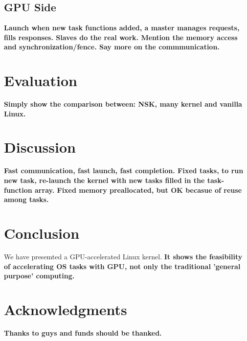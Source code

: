 \documentclass[letterpaper,twocolumn,10pt]{article}
\begin{document}
\subsection{GPU Side}

{\color{red} \bf  Launch when new task functions added, a master manages requests, fills responses. Slaves do the real work. Mention the memory access and synchronization/fence. Say more on the commmunication.}


\section{Evaluation}

{\color{red} \bf Simply show the comparison between: NSK, many kernel and vanilla Linux.}


\section{Discussion}

{\color{red} \bf Fast communication, fast launch, fast completion. Fixed tasks, to run new task, re-launch the kernel with new tasks filled in the task-function array. Fixed memory preallocated, but OK becasue of reuse among tasks. }


\section{Conclusion}

We have presemted a GPU-accelerated Linux kernel. {\color{red} \bf It shows the feasibility of accelerating OS tasks with GPU, not only the traditional 'general purpose' computing. }


\section{Acknowledgments}

{\color{red} \bf Thanks to guys and funds should be thanked.}

{\footnotesize 
}


\theendnotes
\end{document}
